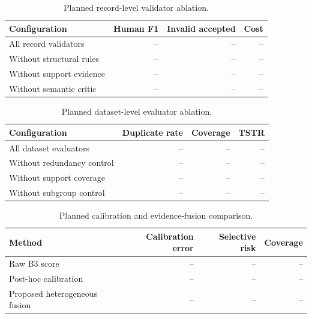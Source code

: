 
\begin{table}[t]
  \centering
  \caption{Planned record-level validator ablation.}
  \label{tab:future-record-ablation}
  \begin{tabular}{@{}lrrr@{}}
    \toprule
    Configuration & Human F1 & Invalid accepted & Cost \\
    \midrule
    All record validators & -- & -- & -- \\
    Without structural rules & -- & -- & -- \\
    Without support evidence & -- & -- & -- \\
    Without semantic critic & -- & -- & -- \\
    \bottomrule
  \end{tabular}
\end{table}

\begin{table}[t]
  \centering
  \caption{Planned dataset-level evaluator ablation.}
  \label{tab:future-dataset-ablation}
  \begin{tabular}{@{}lrrr@{}}
    \toprule
    Configuration & Duplicate rate & Coverage & TSTR \\
    \midrule
    All dataset evaluators & -- & -- & -- \\
    Without redundancy control & -- & -- & -- \\
    Without support coverage & -- & -- & -- \\
    Without subgroup control & -- & -- & -- \\
    \bottomrule
  \end{tabular}
\end{table}

\begin{table}[t]
  \centering
  \caption{Planned calibration and evidence-fusion comparison.}
  \label{tab:future-calibration}
  \begin{tabular}{@{}lrrr@{}}
    \toprule
    Method & Calibration error & Selective risk & Coverage \\
    \midrule
    Raw B3 score & -- & -- & -- \\
    Post-hoc calibration & -- & -- & -- \\
    Proposed heterogeneous fusion & -- & -- & -- \\
    \bottomrule
  \end{tabular}
\end{table}

